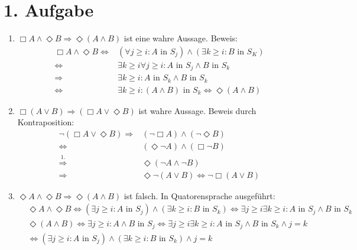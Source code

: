 \documentclass[numbers=noendperiod]{scrartcl}
\begin{document}
\section*{1. Aufgabe}
	\begin{enumerate}
		\item $\Box A \land \Diamond B \Rightarrow \Diamond (A \land B)$ ist eine wahre Aussage. Beweis:
		\begin{align}
			\Box A \land \Diamond B \Leftrightarrow &(\forall j \ge i : A \text{ in } S_j) \land (\exists k\ge i : B \text{ in } S_K)\\
			\Leftrightarrow &\exists k \ge i \forall j\ge i: A \text{ in } S_j \land B \text{ in } S_k\\
			\Rightarrow & \exists k \ge i : A\text{ in } S_k \land B \text{ in } S_k\\
			\Leftrightarrow & \exists k \ge i : (A \land B) \text{ in } S_k \Leftrightarrow \Diamond (A\land B)
		\end{align}
		
		\item $\Box (A \lor B) \Rightarrow (\Box A \lor \Diamond B)$ ist wahre Aussage. Beweis durch Kontraposition:
		\begin{align}
			\lnot (\Box A \lor \Diamond B) \Rightarrow & (\lnot \Box A ) \land (\lnot \Diamond B)\\
			\Leftrightarrow &(\Diamond \lnot A) \land (\Box \lnot B)\\
			\overset{1.}{\Rightarrow} &\Diamond(\lnot A \land \lnot B)\\
			\Rightarrow & \Diamond\lnot (A \lor B) \Leftrightarrow \lnot \Box (A \lor B)
		\end{align}
		
		\item $\Diamond A \land \Diamond B \Rightarrow \Diamond (A \land B)$ ist falsch.
		In Quatorensprache ausgeführt:
		\begin{align}
			&\Diamond A \land \Diamond B \Leftrightarrow (\exists j \ge i : A \text{ in } S_j) \land (\exists k \ge i : B \text{ in } S_k) \Leftrightarrow \exists j \ge i \exists k \ge i : A \text{ in } S_j \land B \text{ in } S_k\\
			&\Diamond (A \land B) \Leftrightarrow \exists j\ge i : A \land B \text{ in } S_j \Leftrightarrow \exists j\ge i \exists k \ge i : A \text{ in } S_j \land B \text{ in } S_k \land j = k\\
			&\Leftrightarrow (\exists j \ge i : A \text{ in } S_j) \land (\exists k \ge i : B \text{ in } S_k) \land j = k
		\end{align}
		

\end{enumerate}
\end{document}
